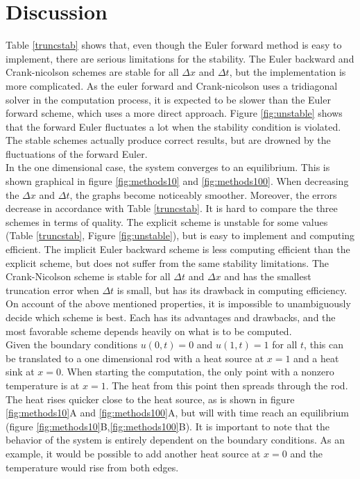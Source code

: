 \documentclass[10pt,a4paper]{article}
\begin{document}
\newpage
\section*{Discussion}

Table \ref{truncstab} shows that, even though the Euler forward method is easy to implement, there are serious limitations for the stability. The Euler backward and Crank-nicolson schemes are stable for all $\Delta x$ and $\Delta t$, but the implementation is more complicated. As the euler forward and Crank-nicolson uses a tridiagonal solver in the computation process, it is expected to be slower than the Euler forward scheme, which uses a more direct approach. Figure \ref{fig:unstable} shows that the forward Euler fluctuates a lot when the stability condition is violated. The stable schemes actually produce correct results, but are drowned by the fluctuations of the forward Euler. 
\\

\noindent In the one dimensional case, the system converges to an equilibrium. This is shown graphical in figure \ref{fig:methods10} and \ref{fig:methods100}. When decreasing the $\Delta x$ and $\Delta t$, the graphs become noticeably smoother. Moreover, the errors decrease in accordance with Table \ref{truncstab}. It is hard to compare the three schemes in terms of quality. The explicit scheme is unstable for some values (Table \ref{truncstab}, Figure \ref{fig:unstable}), but is easy to implement and computing efficient. The implicit Euler backward scheme is less computing efficient than the explicit scheme, but does not suffer from the same stability limitations. The Crank-Nicolson scheme is stable for all $\Delta t$ and $\Delta x$ and has the smallest truncation error when $\Delta t$ is small, but has its drawback in computing efficiency. On account of the above mentioned properties, it is impossible to unambiguously decide which scheme is best. Each has its advantages and drawbacks, and the most favorable scheme depends heavily on what is to be computed.\\

\noindent Given the boundary conditions $u(0,t)=0$ and $u(1,t)=1$ for all $t$, this can be translated to a one dimensional rod with  a heat source at $x=1$ and a heat sink at $x=0$. When starting the computation, the only point with a nonzero temperature is at $x=1$. The heat from this point then spreads through the rod. The heat rises quicker close to the heat source, as is shown in figure \ref{fig:methods10}A and \ref{fig:methods100}A, but will with time reach an equilibrium (figure \ref{fig:methods10}B,\ref{fig:methods100}B). It is important to note that the behavior of the system is entirely dependent on the boundary conditions. As an example, it would be possible to add another heat source at $x=0$ and the temperature would rise from both edges.   
\\
\end{document}
